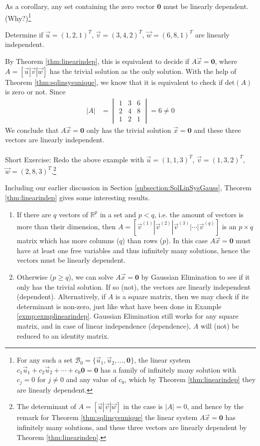 As a corollary, any set containing the zero vector $\textbf{0}$ must be linearly dependent. (Why?)\footnote{For any such a set $\mathcal{B}_0 = \{\vec{u}_1, \vec{u}_2, \ldots, \textbf{0}\}$, the linear system $c_1\vec{u}_1 + c_2\vec{u}_2 + \cdots + c_0\textbf{0} = \textbf{0}$ has a family of infinitely many solution with $c_j = 0$ for $j \neq 0$ and any value of $c_0$, which by Theorem \ref{thm:linearindep} they are linearly dependent.}
\begin{exmp}
\label{exmp:exmplinearindep}
Determine if $\vec{u} = (1,2,1)^T$, $\vec{v} = (3,4,2)^T$, $\vec{w} = (6,8,1)^T$ are linearly independent.
\end{exmp}
By Theorem \ref{thm:linearindep}, this is equivalent to decide if $A\vec{x} = \textbf{0}$, where $A = [\vec{u}|\vec{v}|\vec{w}]$ has the trivial solution as the only solution. With the help of Theorem \ref{thm:sqlinsysunique}, we know that it is equivalent to check if $\text{det}(A)$ is zero or not. Since
\begin{align*}
|A| &=
\begin{vmatrix}
1 & 3 & 6\\
2 & 4 & 8 \\
1 & 2 & 1
\end{vmatrix} = 6 \neq 0
\end{align*}
We conclude that $A\vec{x} = \textbf{0}$ only has the trivial solution $\vec{x} = \textbf{0}$ and these three vectors are linearly independent. \\
\\
Short Exercise: Redo the above example with $\vec{u} = (1,1,3)^T$, $\vec{v} = (1,3,2)^T$, $\vec{w} = (2,8,3)^T$.\footnote{The determinant of $A = [\vec{u}|\vec{v}|\vec{w}]$ in the case is $|A| = 0$, and hence by the remark for Theorem \ref{thm:sqlinsysunique} the linear system $A\vec{x} = \textbf{0}$ has infinitely many solutions, and these three vectors are linearly dependent by Theorem \ref{thm:linearindep}.}\par
Including our earlier discussion in Section \ref{subsection:SolLinSysGauss}, Theorem \ref{thm:linearindep} gives some interesting results.
\begin{enumerate}
\item If there are $q$ vectors of $\mathbb{R}^p$ in a set and $p < q$, i.e. the amount of vectors is more than their dimension, then $A = [\vec{v}^{(1)}|\vec{v}^{(2)}|\vec{v}^{(3)}|\cdots|\vec{v}^{(q)}]$ is an $p \times q$ matrix which has more columns ($q$) than rows ($p$). In this case $A\vec{x} = \textbf{0}$ must have at least one free variables and thus infinitely many solutions, hence the vectors must be linearly dependent.
\item Otherwise ($p \geq q$), we can solve $A\vec{x} = \textbf{0}$ by Gaussian Elimination to see if it only has the trivial solution. If so (not), the vectors are linearly independent (dependent). Alternatively, if $A$ is a square matrix, then we may check if its determinant is non-zero, just like what have been done in Example \ref{exmp:exmplinearindep}. Gaussian Elimination still works for any square matrix, and in case of linear independence (dependence), $A$ will (not) be reduced to an identity matrix.
\end{enumerate}
